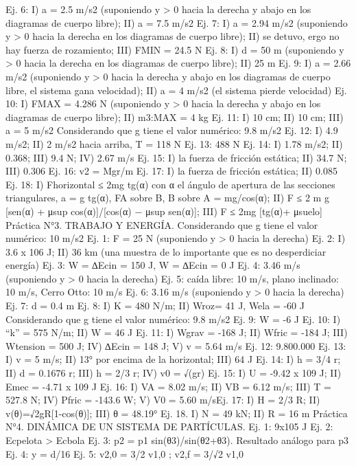Ej. 6: I) a = 2.5 m/s2 (suponiendo y > 0 hacia la derecha y abajo en los diagramas de cuerpo
libre); II) a = 7.5 m/s2
Ej. 7: I) a = 2.94 m/s2 (suponiendo y > 0 hacia la derecha en los diagramas de cuerpo libre);
II) se detuvo, ergo no hay fuerza de rozamiento; III) FMIN = 24.5 N
Ej. 8: I) d = 50 m (suponiendo y > 0 hacia la derecha en los diagramas de cuerpo libre); II)
25 m
Ej. 9: I) a = 2.66 m/s2 (suponiendo y > 0 hacia la derecha y abajo en los diagramas de
cuerpo libre, el sistema gana velocidad); II) a = 4 m/s2 (el sistema pierde velocidad)
Ej. 10: I) FMAX = 4.286 N (suponiendo y > 0 hacia la derecha y abajo en los diagramas de
cuerpo libre); II) m3:MAX = 4 kg
Ej. 11: I) 10 cm; II) 10 cm; III) a = 5 m/s2
Considerando que g tiene el valor numérico: 9.8 m/s2
Ej. 12: I) 4.9 m/s2; II) 2 m/s2 hacia arriba, T = 118 N
Ej. 13: 488 N
Ej. 14: I) 1.78 m/s2; II) 0.368; III) 9.4 N; IV) 2.67 m/s
Ej. 15: I) la fuerza de fricción estática; II) 34.7 N; III) 0.306
Ej. 16: v2 = Mgr/m
Ej. 17: I) la fuerza de fricción estática; II) 0.085
Ej. 18: I) Fhorizontal ≤ 2mg tg(α) con α el ángulo de apertura de las secciones triangulares, a = g
tg(α), FA sobre B, B sobre A = mg/cos(α); II) F ≤ 2 m g [sen(α) + μsup cos(α)]/[cos(α) − μsup sen(α)]; III)
F ≤ 2mg [tg(α)+ μsuelo]
Práctica N°3. TRABAJO Y ENERGÍA.
Considerando que g tiene el valor numérico: 10 m/s2
Ej. 1: F = 25 N (suponiendo y > 0 hacia la derecha)
Ej. 2: I) 3.6 x 106 J; II) 36 km (una muestra de lo importante que es no desperdiciar
energía)
Ej. 3: W = ∆Ecin = 150 J, W = ∆Ecin = 0 J
Ej. 4: 3.46 m/s (suponiendo y > 0 hacia la derecha)
Ej. 5: caída libre: 10 m/s, plano inclinado: 10 m/s, Cerro Otto: 10 m/s
Ej. 6: 3.16 m/s (suponiendo y > 0 hacia la derecha)
Ej. 7: d = 0.4 m
Ej. 8: I) K = 480 N/m; II) Wroz= 41 J, Wela = -60 J
Considerando que g tiene el valor numérico: 9.8 m/s2
Ej. 9: W = -6 J
Ej. 10: I) “k” = 575 N/m; II) W = 46 J
Ej. 11: I) Wgrav = -168 J; II) Wfric = -184 J; III) Wtension = 500 J; IV) ∆Ecin = 148 J; V) v = 5.64
m/s
Ej. 12: 9.800.000
Ej. 13: I) v = 5 m/s; II) 13° por encima de la horizontal; III) 64 J
Ej. 14: I) h = 3/4 r; II) d = 0.1676 r; III) h = 2/3 r; IV) v0 = √(gr)
Ej. 15: I) U = -9.42 x 109 J; II) Emec = -4.71 x 109 J
Ej. 16: I) VA = 8.02 m/s; II) VB = 6.12 m/s; III) T = 527.8 N; IV) Pfric = -143.6 W; V) V0 = 5.60
m/sEj. 17: I) H = 2/3 R; II) v(θ)=√{2gR[1-cos(θ)]}; III) θ = 48.19°
Ej. 18. I) N = 49 kN; II) R = 16 m
Práctica N°4. DINÁMICA DE UN SISTEMA DE
PARTÍCULAS.
Ej. 1: 9x105 J
Ej. 2: Ecpelota > Ecbola
Ej. 3: p2 = p1 sin(θ3)/sin(θ2+θ3). Resultado análogo para p3
Ej. 4: y = d/16
Ej. 5: v2,0 = 3/2 v1,0 ; v2,f = 3/√2 v1,0
